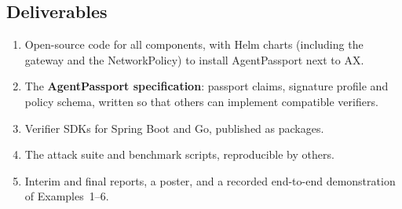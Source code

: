 \subsection{Deliverables}

\begin{enumerate}
  \item Open-source code for all components, with Helm charts (including the  gateway and the  NetworkPolicy) to install AgentPassport next to AX.
  \item The \textbf{AgentPassport specification}: passport claims, signature profile and policy schema, written so that others can implement compatible verifiers.
  \item Verifier SDKs for Spring Boot and Go, published as packages.
  \item The attack suite and benchmark scripts, reproducible by others.
  \item Interim and final reports, a poster, and a recorded end-to-end demonstration of Examples~1--6.
\end{enumerate}
